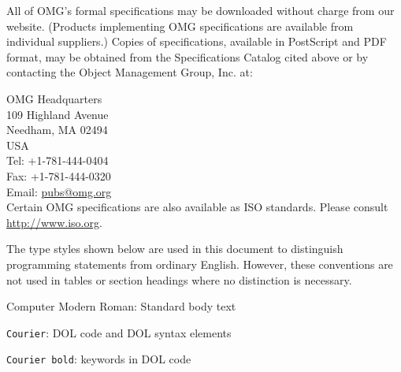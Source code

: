 \documentclass[10pt, a4paper]{isov2}
\begin{document}
\medskip 
\noindent
All of OMG's formal specifications may be downloaded without charge from our website. (Products implementing OMG specifications are available from
 individual suppliers.) Copies of specifications, available in PostScript and
 PDF format, may be obtained from the Specifications Catalog cited above or by contacting the Object Management Group, Inc. at:



\medskip
\noindent 
OMG Headquarters \\
109 Highland Avenue \\
Needham, MA 02494 \\
USA\\
Tel: +1-781-444-0404\\
Fax: +1-781-444-0320\\
Email: \url{pubs@omg.org}\\

\noindent Certain OMG specifications are also available as ISO standards. Please consult \url{http://www.iso.org}.




The type styles shown below are used in this document to distinguish
 programming statements from ordinary English. However, these conventions are
 not used in tables or section headings where no distinction is necessary.


\medskip \noindent
Computer Modern Roman: Standard body text

\lstinline{Courier}: DOL code and DOL syntax elements

\lstinline[keywordstyle=\color{black}\bfseries, keywords={Courier, bold}]{Courier bold}: keywords in DOL code



%
%
%
%
\end{document}
